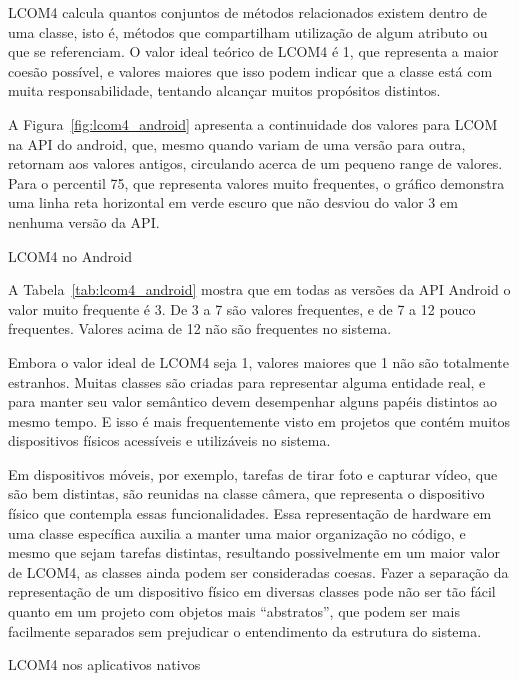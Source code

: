 LCOM4 calcula quantos conjuntos de métodos relacionados existem dentro de uma classe, isto é, métodos que compartilham utilização de algum atributo ou que se referenciam. O valor ideal teórico de LCOM4 é 1, que representa a maior coesão possível, e valores maiores que isso podem indicar que a classe está com muita responsabilidade, tentando alcançar muitos propósitos distintos.


A Figura~\ref{fig:lcom4_android} apresenta a continuidade dos valores para LCOM na API do android, que, mesmo quando variam de uma versão para outra, retornam aos valores antigos, circulando acerca de um pequeno range de valores. Para o percentil 75, que representa valores muito frequentes, o gráfico demonstra uma linha reta horizontal em verde escuro que não desviou do valor 3 em nenhuma versão da API.

\begin{table}[!htb]
\centering
{}

\caption{LCOM4 no Android}
\label{tab:lcom4_android}
\end{table}

A Tabela~\ref{tab:lcom4_android} mostra que em todas as versões da API Android o valor muito frequente é 3. De 3 a 7 são valores frequentes, e de 7 a 12 pouco frequentes. Valores acima de 12 não são frequentes no sistema. 

Embora o valor ideal de LCOM4 seja 1, valores maiores que 1 não são totalmente estranhos. Muitas classes são criadas para representar alguma entidade real, e para manter seu valor semântico devem desempenhar alguns papéis distintos ao mesmo tempo. E isso é mais frequentemente visto em projetos que contém muitos dispositivos físicos acessíveis e utilizáveis no sistema. 

Em dispositivos móveis, por exemplo, tarefas de tirar foto e capturar vídeo, que são bem distintas, são reunidas na classe câmera, que representa o dispositivo físico que contempla essas funcionalidades. Essa representação de hardware em uma classe específica auxilia a manter uma maior organização no código, e mesmo que sejam tarefas distintas, resultando possivelmente em um maior valor de LCOM4, as classes ainda podem ser consideradas coesas. Fazer a separação da representação de um dispositivo físico em diversas classes pode não ser tão fácil quanto em um projeto com objetos mais ``abstratos'', que podem ser mais facilmente separados sem prejudicar o entendimento da estrutura do sistema.

\begin{table}[!htb]
\centering
{}

\caption{LCOM4 nos aplicativos nativos}
\label{tab:lcom4_apps}
\end{table}

